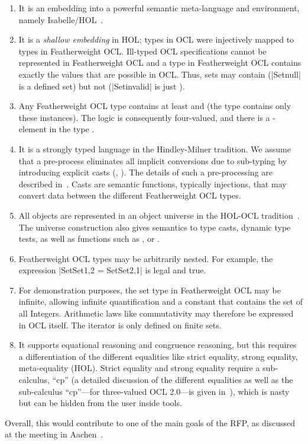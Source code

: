 \begin{enumerate}
\item It is an embedding into a powerful semantic meta-language and
  environment, namely
  Isabelle/HOL~\cite{nipkow.ea:isabelle:2002}.
\item It is a \emph{shallow embedding} in HOL; types
  in OCL were injectively mapped to types in Featherweight
  OCL\@. Ill-typed OCL specifications cannot be represented in
  Featherweight OCL and a type in Featherweight OCL contains exactly
  the values that are possible in OCL\@. Thus, sets may contain
   (\inlineocl|Set{null}| is a defined set) but not
   (\inlineocl|Set{invalid}| is just
  ).
\item Any Featherweight OCL type contains at least
   and  (the type 
  contains only these instances). The logic is consequently
  four-valued, and there is a -element in the type
  .
\item It is a strongly typed language in the Hindley-Milner tradition.
  We assume that a pre-process eliminates all implicit conversions due
  to sub-typing by introducing explicit casts (\eg,
  ). The details of such a pre-processing are
  described in~\cite{brucker:interactive:2007}.  Casts are semantic
  functions, typically injections, that may convert data between the
  different Featherweight OCL types.
\item All objects are represented in an object universe in the HOL-OCL
  tradition~\cite{brucker.ea:extensible:2008-b}. The universe
  construction also gives semantics to type casts, dynamic type
  tests, as well as functions such as ,
  or .
\item Featherweight OCL types may be arbitrarily nested. For example,
  the expression
  \inlineocl|Set{Set{1,2}} = Set{Set{2,1}}| is legal and true.
\item For demonstration purposes, the set type in Featherweight OCL
  may be infinite, allowing infinite quantification and a constant
  that contains the set of all Integers.  Arithmetic laws like
  commutativity may therefore be expressed in OCL itself.  The
  iterator is only defined on finite sets.
\item It supports equational reasoning and congruence reasoning, but
  this requires a differentiation of the different equalities like
  strict equality, strong equality, meta-equality (HOL). Strict
  equality and strong equality require a sub-calculus, ``cp'' (a
  detailed discussion of the different equalities as well as the
  sub-calculus ``cp''---for three-valued OCL 2.0---is given
  in~\cite{brucker.ea:semantics:2009}), which is nasty but can be
  hidden from the user inside tools.
\end{enumerate}
Overall, this would contribute to one of the main goals of the 
RFP, as discussed at the \OCL meeting in
Aachen~\cite{brucker.ea:summary-aachen:2013}.
\endisatagafp


